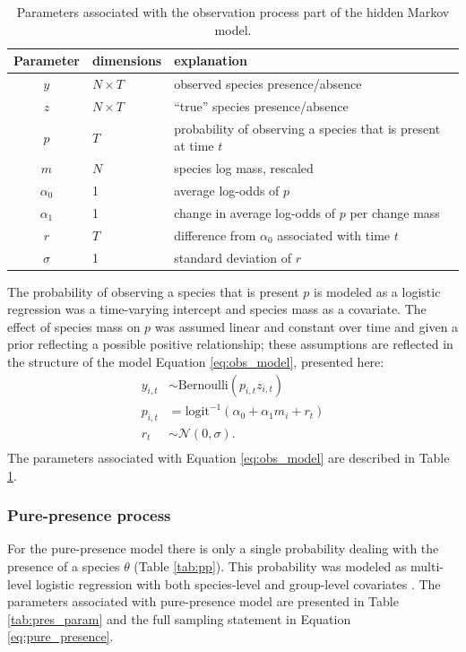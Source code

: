 \documentclass[12pt,letterpaper]{article}
\begin{document}
\begin{table}
  \centering
  \caption{Parameters associated with the observation process part of the hidden Markov model.}
  \begin{tabular}{c l l}
    Parameter & dimensions & explanation \\
    \hline
    \(y\) & \(N \times T\) & observed species presence/absence \\
    \(z\) & \(N \times T\) & ``true'' species presence/absence \\
    \(p\) & \(T\) & probability of observing a species that is present at time \(t\) \\
    \(m\) & \(N\) & species log mass, rescaled \\
    \(\alpha_{0}\) & 1 & average log-odds of \(p\) \\ %
    \(\alpha_{1}\) & 1 & change in average log-odds of \(p\) per change mass \\
    \(r\) & \(T\) & difference from \(\alpha_{0}\) associated with time \(t\) \\
    \(\sigma\) & 1 & standard deviation of \(r\) \\
  \end{tabular}
  \label{tab:obs_param}
\end{table}

The probability of observing a species that is present \(p\) is modeled as a logistic regression was a time-varying intercept and species mass as a covariate. The effect of species mass on \(p\) was assumed linear and constant over time and given a prior reflecting a possible positive relationship; these assumptions are reflected in the structure of the model Equation \ref{eq:obs_model}, presented here:
\begin{equation}
  \begin{aligned}
    y_{i, t} &\sim \text{Bernoulli}(p_{i, t} z_{i, t}) \\
    p_{i, t} &= \text{logit}^{-1}(\alpha_{0} + \alpha_{1} m_{i} + r_{t}) \\ 
    r_{t} &\sim \mathcal{N}(0, \sigma). \\
  \end{aligned}
  \label{eq:obs_model}
\end{equation}
The parameters associated with Equation \ref{eq:obs_model} are described in Table \ref{tab:obs_param}.


\subsubsection*{Pure-presence process}
For the pure-presence model there is only a single probability dealing with the presence of a species \(\theta\) (Table \ref{tab:pp}). This probability was modeled as multi-level logistic regression with both species-level and group-level covariates \citep{Gelman2007,Gelman2013d}. The parameters associated with pure-presence model are presented in Table \ref{tab:pres_param} and the full sampling statement in Equation \ref{eq:pure_presence}.
\end{document}
